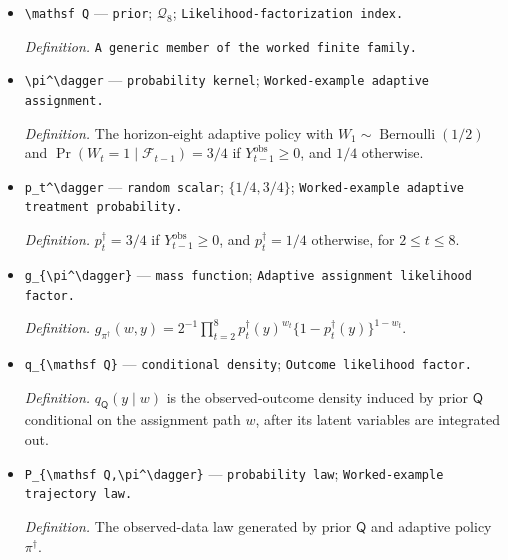 \documentclass{article}
\begin{document}
\begin{itemize}
  \item \texttt{\textbackslash{}\allowbreak{}mathsf Q} --- \texttt{prior}; \(\mathcal Q_8\); \texttt{Likelihood-\allowbreak{}factorization index.}
  \par\smallskip\noindent\emph{Definition.} \texttt{A generic member of the worked finite family.}
  \item \texttt{\textbackslash{}\allowbreak{}pi\textasciicircum{}\textbackslash{}\allowbreak{}dagger} --- \texttt{probability kernel}; \texttt{Worked-\allowbreak{}example adaptive assignment.}
  \par\smallskip\noindent\emph{Definition.} The horizon-eight adaptive policy with \(W_1\sim\operatorname{Bernoulli}(1/2)\) and \(\Pr(W_t=1\mid\mathcal F_{t-1})=3/4\) if \(Y_{t-1}^{\mathrm{obs}}\ge0\), and \(1/4\) otherwise.
  \item \texttt{p\_\allowbreak{}t\textasciicircum{}\textbackslash{}\allowbreak{}dagger} --- \texttt{random scalar}; \(\{1/4,3/4\}\); \texttt{Worked-\allowbreak{}example adaptive treatment probability.}
  \par\smallskip\noindent\emph{Definition.} \(p_t^\dagger=3/4\) if \(Y_{t-1}^{\mathrm{obs}}\ge0\), and \(p_t^\dagger=1/4\) otherwise, for \(2\le t\le8\).
  \item \texttt{g\_\allowbreak{}\{\textbackslash{}\allowbreak{}pi\textasciicircum{}\textbackslash{}\allowbreak{}dagger\}\allowbreak{}} --- \texttt{mass function}; \texttt{Adaptive assignment likelihood factor.}
  \par\smallskip\noindent\emph{Definition.} \(g_{\pi^\dagger}(w,y)=2^{-1}\prod_{t=2}^8p_t^\dagger(y)^{w_t}\{1-p_t^\dagger(y)\}^{1-w_t}\).
  \item \texttt{q\_\allowbreak{}\{\textbackslash{}\allowbreak{}mathsf Q\}\allowbreak{}} --- \texttt{conditional density}; \texttt{Outcome likelihood factor.}
  \par\smallskip\noindent\emph{Definition.} \(q_{\mathsf Q}(y\mid w)\) is the observed-outcome density induced by prior \(\mathsf Q\) conditional on the assignment path \(w\), after its latent variables are integrated out.
  \item \texttt{P\_\allowbreak{}\{\textbackslash{}\allowbreak{}mathsf Q,\allowbreak{}\textbackslash{}\allowbreak{}pi\textasciicircum{}\textbackslash{}\allowbreak{}dagger\}\allowbreak{}} --- \texttt{probability law}; \texttt{Worked-\allowbreak{}example trajectory law.}
  \par\smallskip\noindent\emph{Definition.} The observed-data law generated by prior \(\mathsf Q\) and adaptive policy \(\pi^\dagger\).

\end{itemize}
\end{document}
